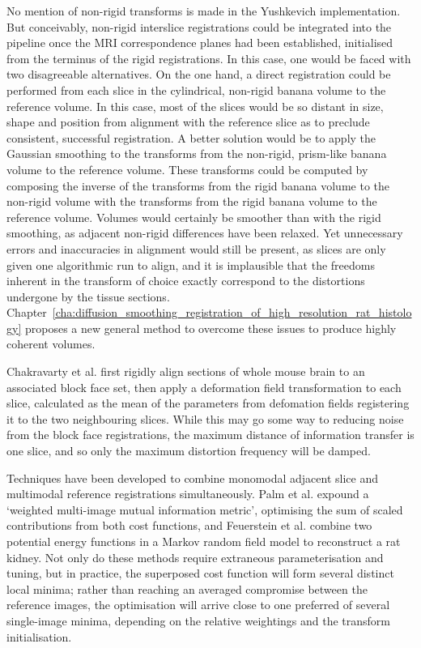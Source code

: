   No mention of non-rigid transforms is made in the Yushkevich implementation. But conceivably, non-rigid interslice registrations could be integrated into the pipeline once the MRI correspondence planes had been established, initialised from the terminus of the rigid registrations. In this case, one would be faced with two disagreeable alternatives. On the one hand, a direct registration could be performed from each slice in the cylindrical, non-rigid banana volume to the reference volume. In this case, most of the slices would be so distant in size, shape and position from alignment with the reference slice as to preclude consistent, successful registration. A better solution would be to apply the Gaussian smoothing to the transforms from the non-rigid, prism-like banana volume to the reference volume. These transforms could be computed by composing the inverse of the transforms from the rigid banana volume to the non-rigid volume with the transforms from the rigid banana volume to the reference volume. Volumes would certainly be smoother than with the rigid smoothing, as adjacent non-rigid differences have been relaxed. Yet unnecessary errors and inaccuracies in alignment would still be present, as slices are only given one algorithmic run to align, and it is implausible that the freedoms inherent in the transform of choice exactly correspond to the distortions undergone by the tissue sections. Chapter~\ref{cha:diffusion_smoothing_registration_of_high_resolution_rat_histology} proposes a new general method to overcome these issues to produce highly coherent volumes.
  
  Chakravarty et al. \cite{Chakravarty2008} first rigidly align sections of whole mouse brain to an associated block face set, then apply a deformation field transformation to each slice, calculated as the mean of the parameters from defomation fields registering it to the two neighbouring slices. While this may go some way to reducing noise from the block face registrations, the maximum distance of information transfer is one slice, and so only the maximum distortion frequency will be damped.
  
  Techniques have been developed to combine monomodal adjacent slice and multimodal reference registrations simultaneously. Palm et al. \cite{Palm2008} expound a `weighted multi-image mutual information metric', optimising the sum of scaled contributions from both cost functions, and Feuerstein et al. \cite{Feuerstein2011} combine two potential energy functions in a Markov random field model to reconstruct a rat kidney. Not only do these methods require extraneous parameterisation and tuning, but in practice, the superposed cost function will form several distinct local minima; rather than reaching an averaged compromise between the reference images, the optimisation will arrive close to one preferred of several single-image minima, depending on the relative weightings and the transform initialisation.
  
